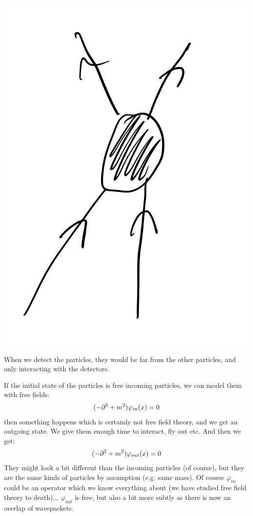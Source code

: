 \begin{center}
    \includegraphics[scale=0.4]{Images/fig-lec30p4.png}
\end{center}

When we detect the particles, they would be far from the other particles, and only interacting with the detectors.

If the initial state of the particles is free incoming particles, we can model them with free fields:
\begin{equation}
    (-\p^2 + m^2)\varphi_{in}(x) = 0
\end{equation}
then something happens which is certainly not free field theory, and we get an outgoing state. We give them enough time to interact, fly out etc. And then we get:
\begin{equation}
    (-\p^2 + m^2)\varphi_{out}(x) = 0
\end{equation}
They might look a bit different than the incoming particles (of course), but they are the same kinds of particles by assumption (e.g. same mass). Of course $\varphi_{in}$ could be an operator which we know everything about (we have studied free field theory to death)... $\varphi_{out}$ is free, but also a bit more subtly as there is now an overlap of wavepackets.

